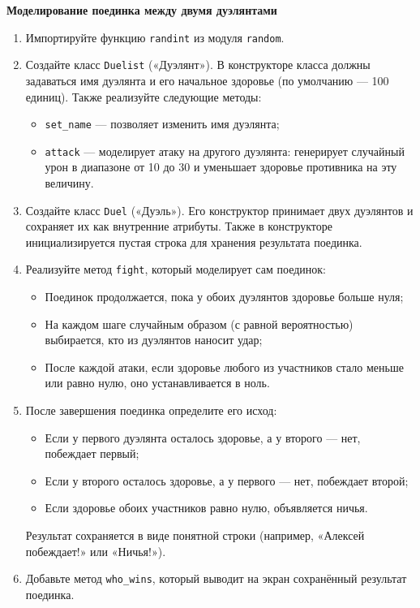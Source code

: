 \item \textbf{Моделирование поединка между двумя дуэлянтами}

\begin{enumerate}
    \item Импортируйте функцию \texttt{randint} из модуля \texttt{random}.

    \item Создайте класс \texttt{Duelist} («Дуэлянт»).  
    В конструкторе класса должны задаваться имя дуэлянта и его начальное здоровье (по умолчанию — 100 единиц).  
    Также реализуйте следующие методы:
    \begin{itemize}
        \item \texttt{set\_name} — позволяет изменить имя дуэлянта;
        \item \texttt{attack} — моделирует атаку на другого дуэлянта: генерирует случайный урон в диапазоне от 10 до 30 и уменьшает здоровье противника на эту величину.
    \end{itemize}

    \item Создайте класс \texttt{Duel} («Дуэль»).  
    Его конструктор принимает двух дуэлянтов и сохраняет их как внутренние атрибуты. Также в конструкторе инициализируется пустая строка для хранения результата поединка.

    \item Реализуйте метод \texttt{fight}, который моделирует сам поединок:
    \begin{itemize}
        \item Поединок продолжается, пока у обоих дуэлянтов здоровье больше нуля;
        \item На каждом шаге случайным образом (с равной вероятностью) выбирается, кто из дуэлянтов наносит удар;
        \item После каждой атаки, если здоровье любого из участников стало меньше или равно нулю, оно устанавливается в ноль.
    \end{itemize}

    \item После завершения поединка определите его исход:
    \begin{itemize}
        \item Если у первого дуэлянта осталось здоровье, а у второго — нет, побеждает первый;
        \item Если у второго осталось здоровье, а у первого — нет, побеждает второй;
        \item Если здоровье обоих участников равно нулю, объявляется ничья.
    \end{itemize}
    Результат сохраняется в виде понятной строки (например, «Алексей побеждает!» или «Ничья!»).

    \item Добавьте метод \texttt{who\_wins}, который выводит на экран сохранённый результат поединка.
\end{enumerate}

